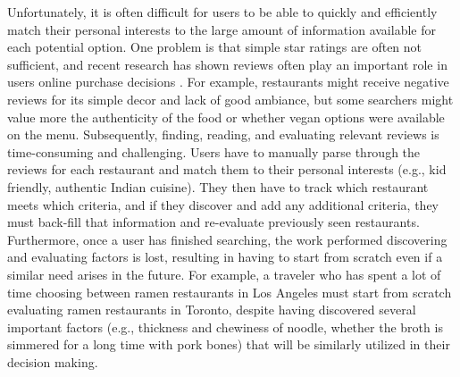 
Unfortunately, it is often difficult for users to be able to quickly and efficiently match their personal interests to the large amount of information available for each potential option. One problem is that simple star ratings are often not sufficient, and recent research has shown reviews often play an important role in users online purchase decisions \cite{mudambi2010research,gan2012helpfulness}. For example, restaurants might receive negative reviews for its simple decor and lack of good ambiance, but some searchers might value more the authenticity of the food or whether vegan options were available on the menu. Subsequently, finding, reading, and evaluating relevant reviews is time-consuming and challenging. Users have to manually parse through the reviews for each restaurant and match them to their personal interests (e.g., kid friendly, authentic Indian cuisine). They then have to track which restaurant meets which criteria, and if they discover and add any additional criteria, they must back-fill that information and re-evaluate previously seen restaurants. Furthermore, once a user has finished searching, the work performed discovering and evaluating factors is lost, resulting in having to start from scratch even if a similar need arises in the future. For example, a traveler who has spent a lot of time choosing between ramen restaurants in Los Angeles must start from scratch evaluating ramen restaurants in Toronto, despite having discovered several important factors (e.g., thickness and chewiness of noodle, whether the broth is simmered for a long time with pork bones) that will be similarly utilized in their decision making.

